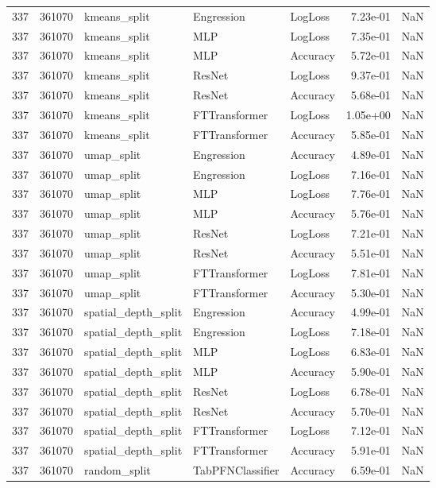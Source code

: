 \begin{tabular}{rrlllrr}
337 & 361070 & kmeans\_split & Engression & LogLoss & 7.23e-01 & NaN \\
337 & 361070 & kmeans\_split & MLP & LogLoss & 7.35e-01 & NaN \\
337 & 361070 & kmeans\_split & MLP & Accuracy & 5.72e-01 & NaN \\
337 & 361070 & kmeans\_split & ResNet & LogLoss & 9.37e-01 & NaN \\
337 & 361070 & kmeans\_split & ResNet & Accuracy & 5.68e-01 & NaN \\
337 & 361070 & kmeans\_split & FTTransformer & LogLoss & 1.05e+00 & NaN \\
337 & 361070 & kmeans\_split & FTTransformer & Accuracy & 5.85e-01 & NaN \\
337 & 361070 & umap\_split & Engression & Accuracy & 4.89e-01 & NaN \\
337 & 361070 & umap\_split & Engression & LogLoss & 7.16e-01 & NaN \\
337 & 361070 & umap\_split & MLP & LogLoss & 7.76e-01 & NaN \\
337 & 361070 & umap\_split & MLP & Accuracy & 5.76e-01 & NaN \\
337 & 361070 & umap\_split & ResNet & LogLoss & 7.21e-01 & NaN \\
337 & 361070 & umap\_split & ResNet & Accuracy & 5.51e-01 & NaN \\
337 & 361070 & umap\_split & FTTransformer & LogLoss & 7.81e-01 & NaN \\
337 & 361070 & umap\_split & FTTransformer & Accuracy & 5.30e-01 & NaN \\
337 & 361070 & spatial\_depth\_split & Engression & Accuracy & 4.99e-01 & NaN \\
337 & 361070 & spatial\_depth\_split & Engression & LogLoss & 7.18e-01 & NaN \\
337 & 361070 & spatial\_depth\_split & MLP & LogLoss & 6.83e-01 & NaN \\
337 & 361070 & spatial\_depth\_split & MLP & Accuracy & 5.90e-01 & NaN \\
337 & 361070 & spatial\_depth\_split & ResNet & LogLoss & 6.78e-01 & NaN \\
337 & 361070 & spatial\_depth\_split & ResNet & Accuracy & 5.70e-01 & NaN \\
337 & 361070 & spatial\_depth\_split & FTTransformer & LogLoss & 7.12e-01 & NaN \\
337 & 361070 & spatial\_depth\_split & FTTransformer & Accuracy & 5.91e-01 & NaN \\
337 & 361070 & random\_split & TabPFNClassifier & Accuracy & 6.59e-01 & NaN \\

\end{tabular}
